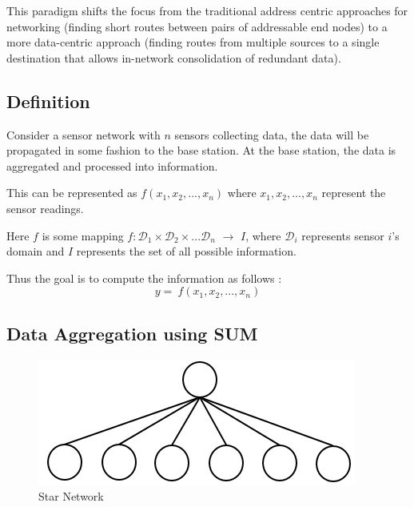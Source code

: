 \documentclass[%
  slidesonly,%
  semlayer%
  ]{seminar}                                  %
\begin{document}
\begin{slide}
  This paradigm shifts the focus from the traditional address centric approaches for networking (finding short routes between pairs of addressable end nodes) to a more data-centric approach (finding routes from multiple sources to a single destination that allows in-network consolidation of redundant data).
  \clearpage

  \subsection*{Definition}
      Consider a sensor network with $n$ sensors collecting data, the data will be propagated in some fashion to the base station.
      At the base station, the data is aggregated and processed into information. 
      
      This can be represented as
        $f(x_{1}, x_{2},...,x_{n})$
      where $x_{1}, x_{2},..., x_{n}$ represent the sensor readings.
      
      Here $f$ is some mapping $f: \mathcal{D}_{1} \times \mathcal{D}_{2} \times ... \mathcal{D}_{n}$ $\rightarrow$ $I$, where $\mathcal{D}_{i}$ represents sensor $i$'s domain and $I$ represents the set of all possible information. 

      Thus the goal is to compute the information as follows :
      \begin{equation}
        \label{eq:aggregation}
        y =\ f(x_{1}, x_{2},...,x_{n})
      \end{equation}

      \clearpage

  \subsection*{Data Aggregation using SUM}
      
      \begin{figure}[h!]
        \centering
        \includegraphics[scale = 0.5]{images/star-tree.png}
        \caption{Star Network}
        \label{fig:star-network}
      \end{figure}


\end{slide}
\end{document}
